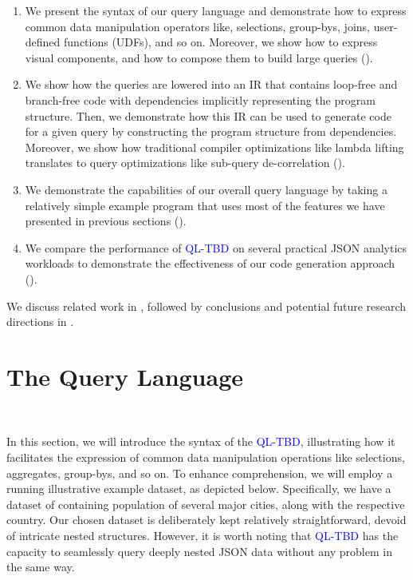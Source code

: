 \documentclass[runningheads]{llncs}
\newcommand{\lang}{\textcolor{blue}{QL-TBD}}
\begin{document}
\begin{enumerate}
    \item We present the syntax of our query language and demonstrate how to express common
          data manipulation operators like, selections, group-bys, joins, user-defined functions (UDFs),
          and so on.
          Moreover, we show how to express visual components, and how to compose them to build
          large queries ().
    \item We show how the queries are lowered into an IR that contains loop-free and branch-free code
          with dependencies implicitly representing the program structure.
          Then, we demonstrate how this IR can be used to generate code for a given query by constructing
          the program structure from dependencies.
          Moreover, we show how traditional compiler optimizations like lambda lifting translates to query
          optimizations like sub-query de-correlation ().
    \item We demonstrate the capabilities of our overall query language by taking a relatively simple example
          program that uses most of the features we have presented in previous sections ().
    \item We compare the performance of \lang{} on several practical JSON analytics workloads to demonstrate the
          effectiveness of our code generation approach ().
\end{enumerate}

We discuss related work in , followed by conclusions and potential future research directions
in .


\section{The Query Language}~\label{sec:query_language}

In this section, we will introduce the syntax of the \lang{}, illustrating how it facilitates
the expression of common data manipulation operations like selections, aggregates,
group-bys, and so on.
To enhance comprehension, we will employ a running illustrative example dataset, as
depicted below.
Specifically, we have a dataset of containing population of several major cities,
along with the respective country.
Our chosen dataset is deliberately kept relatively straightforward, devoid of
intricate nested structures.
However, it is worth noting that \lang{} has the capacity to seamlessly query
deeply nested JSON data without any problem in the same way.
\end{document}
